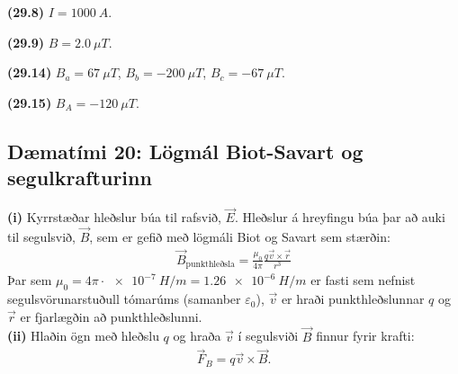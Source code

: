 \ifdefined \wholebook \else\documentclass[oneside]{book}\usepackage{EdlBook}\graphicspath{{figures/}}
\begin{document}
\begin{tcolorbox}
\begin{enumerate*}[label = ]
  \item \textbf{(29.8)} $I = \SI{1000}{A}$.
  \item \textbf{(29.9)} $B = \SI{2.0}{\mu T}$.
  \item \textbf{(29.14)} $B_a = \SI{67}{\mu T}$, $B_b = -\SI{200}{\mu T}$, $B_c = -\SI{67}{\mu T}$.
  \item \textbf{(29.15)} $B_A = -\SI{120}{\mu T}$.
\end{enumerate*}
\end{tcolorbox}


\newpage


\subsection*{Dæmatími 20: Lögmál Biot-Savart og segulkrafturinn}

\begin{tcolorbox}
\textbf{(i)} Kyrrstæðar hleðslur búa til rafsvið, $\vec{E}$. Hleðslur á hreyfingu búa þar að auki til segulsvið, $\vec{B}$, sem er gefið með lögmáli Biot og Savart sem stærðin:
\begin{align*}
    \vec{B}_{\text{punkthleðsla}} = \frac{\mu_0}{4\pi} \frac{q \vec{v} \times \vec{r}}{r^3}
\end{align*}
Þar sem $\mu_0 = 4\pi \cdot \SI{e-7}{H/m} = \SI{1.26e-6}{H/m}$ er fasti sem nefnist segulsvörunarstuðull tómarúms (samanber $\varepsilon_0$), $\vec{v}$ er hraði punkthleðslunnar $q$ og $\vec{r}$ er fjarlægðin að punkthleðslunni. \\

\textbf{(ii)} Hlaðin ögn með hleðslu $q$ og hraða $\vec{v}$ í segulsviði $\vec{B}$ finnur fyrir krafti:
\begin{align*}
    \vec{F}_B = q \vec{v} \times \vec{B}.
\end{align*}
\end{tcolorbox}
\end{document}
